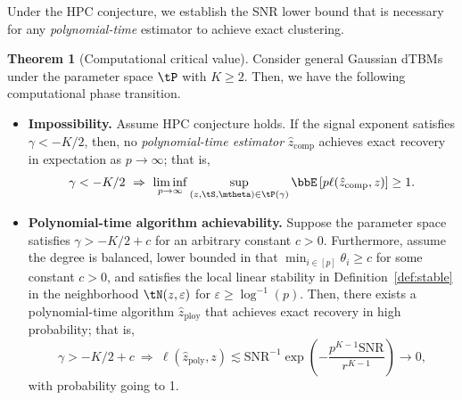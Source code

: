 \documentclass[lettersize,onecolumn,journal]{IEEEtran}
\theoremstyle{definition}
\newtheorem{thm}{Theorem}
\theoremstyle{definition}
\newcommand{\of}[1]{\left(#1\right)}
\begin{document}
Under the HPC conjecture, we establish the SNR lower bound that is necessary for any \emph{polynomial-time} estimator to achieve exact clustering.

{
\color{blue}
\begin{thm}[Computational critical value]\label{thm:comp} 
Consider general Gaussian dTBMs under the parameter space $\tP$ with $K\geq 2$. Then, we have the following computational phase transition.

\begin{itemize}[wide]
    \item \textbf{Impossibility.} Assume HPC conjecture holds. If the signal exponent satisfies $\gamma < -K/2$, then, no \emph{polynomial-time estimator} $\hat z_{\text{comp}}$ achieves exact recovery in expectation as $p\to \infty$; that is, 
\begin{align}
  \gamma<-K/2 \ \Rightarrow \ \liminf_{p\to \infty}\sup_{(z, \tS, \mtheta) \in \tP(\gamma)}  \bbE \left[ p\ell(\hat z_{\text{comp}}, z) \right]\geq 1.
\end{align}
\item \textbf{Polynomial-time algorithm achievability.} Suppose the parameter space satisfies $\gamma  >  -K/2+c$ for an arbitrary constant $c>0$. Furthermore, assume the degree is balanced, lower bounded in that $\min_{i\in[p]}\theta_i\geq c$ for some constant $c>0$, and satisfies the local linear stability in Definition~\ref{def:stable} in the neighborhood $\tN(z,\varepsilon)$ for $\varepsilon \geq \log^{-1}(p)$. Then, there exists a polynomial-time algorithm $\hat z_{\text{ploy}}$ that achieves exact recovery in high probability; that is,
\begin{equation}
  \gamma>-K/2+c\ \Rightarrow   \  \ell(\hat z_{\text{poly}}, z) \lesssim \text{SNR}^{-1}\exp \of{ - \frac{p^{K-1}\text{SNR}}{r^{K-1}} } \to 0,
\end{equation}
with probability going to 1. 
\end{itemize}

\end{thm}
}
\end{document}
